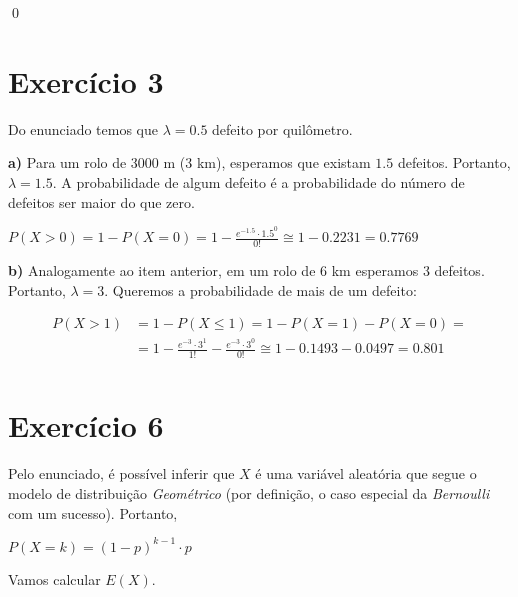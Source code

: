 \documentclass[12pt,letterpaper]{article}
\begin{document}
	\qed
	
	\section*{Exercício 3}
	
	Do enunciado temos que $\lambda = 0.5$ defeito por quilômetro.
	
	\textbf{a)} Para um rolo de $3000$ m ($3$ km), esperamos que existam $1.5$ defeitos. Portanto, $\lambda = 1.5$. A probabilidade de algum defeito é a probabilidade do número de defeitos ser maior do que zero.
	
	\begin{center}
		$P(X>0) = 1 - P(X=0) = 1 - \frac{e^{-1.5}\cdot 1.5^0}{0!} \cong 1 - 0.2231 = 0.7769$
	\end{center} 
	
	\textbf{b)} Analogamente ao item anterior, em um rolo de $6$ km esperamos $3$ defeitos. Portanto, $\lambda = 3$. Queremos a probabilidade de mais de um defeito:
	
	\begin{equation*}
		\begin{split}
			P(X>1) & =   1 - P(X \leq 1) = 1 - P(X=1) - P(X=0) = \\
			& = 1 - \frac{e^{-3}\cdot 3^1}{1!} - \frac{e^{-3}\cdot 3^0}{0!} \cong 1 - 0.1493 - 0.0497 = 0.801\\ 
		\end{split}
	\end{equation*}
	
	\section*{Exercício 6}
	
	Pelo enunciado, é possível inferir que $X$ é uma variável aleatória que segue o modelo de distribuição \textit{Geométrico} (por definição, o caso especial da \textit{Bernoulli} com um sucesso). Portanto, 
	
	\begin{center}
		$P(X=k) = (1-p)^{k-1} \cdot p$
	\end{center}
	
	Vamos calcular $E(X)$. 
	
\end{document}
